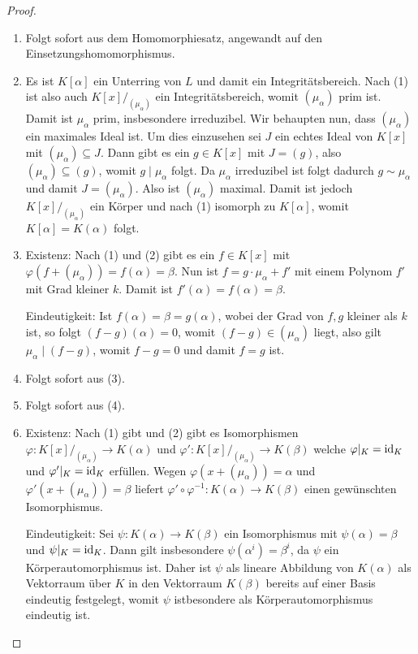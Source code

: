 \begin{proof}{\ }
    \begin{enumerate}
        \item Folgt sofort aus dem Homomorphiesatz, angewandt auf den Einsetzungshomomorphismus.
        
        \item Es ist $K[\alpha]$ ein Unterring von $L$ und damit ein Integritätsbereich. Nach (1) ist also auch $K[x]/_{(\mu_\alpha)}$ ein Integritätsbereich, womit $(\mu_\alpha)$ prim ist. Damit ist $\mu_\alpha$ prim, insbesondere irreduzibel. Wir behaupten nun, dass $(\mu_\alpha)$ ein maximales Ideal ist. Um dies einzusehen sei $J$ ein echtes Ideal von $K[x]$ mit $(\mu_\alpha) \subseteq J$. Dann gibt es ein $g \in K[x]$ mit $J = (g)$, also $(\mu_\alpha) \subseteq (g)$, womit $g \mid \mu_\alpha$ folgt. Da $\mu_\alpha$ irreduzibel ist folgt dadurch $g \sim \mu_\alpha$ und damit $J = (\mu_\alpha)$. Also ist $(\mu_\alpha)$ maximal. Damit ist jedoch $K[x]/_{(\mu_\alpha)}$ ein Körper und nach (1) isomorph zu $K[\alpha]$, womit $K[\alpha] = K(\alpha)$ folgt.
        
        \item Existenz: Nach (1) und (2) gibt es ein $f \in K[x]$ mit $\varphi(f + (\mu_\alpha)) = f(\alpha) = \beta$. Nun ist $f = g \cdot \mu_\alpha + f'$ mit einem Polynom $f'$ mit Grad kleiner $k$. Damit ist $f'(\alpha) = f(\alpha) = \beta$.
        
        Eindeutigkeit: Ist $f(\alpha) = \beta = g(\alpha)$, wobei der Grad von $f, g$ kleiner als $k$ ist, so folgt $(f-g)(\alpha) = 0$, womit $(f-g) \in (\mu_\alpha)$ liegt, also gilt $\mu_\alpha \mid (f-g)$, womit $f-g=0$ und damit $f=g$ ist.

        \item Folgt sofort aus (3).
        
        \item Folgt sofort aus (4).
        
        \item {Existenz:} Nach (1) gibt und (2) gibt es Isomorphismen
        $\varphi:K[x]/_{(\mu_\alpha)}\to K(\alpha)$ und $\varphi':K[x]/_{(\mu_\alpha)}\to K(\beta)$
        welche $\varphi\vert_K=\operatorname{id}_K$ und $\varphi'\vert_K=\operatorname{id}_K$ erfüllen. Wegen $\varphi(x+(\mu_\alpha))=\alpha$
        und $\varphi'(x+(\mu_\alpha))=\beta$ liefert $\varphi'\circ\varphi^{-1}:K(\alpha)\to K(\beta)$
        einen gewünschten Isomorphismus.

        {Eindeutigkeit:} Sei $\psi:K(\alpha)\to K(\beta)$ ein Isomorphismus mit $\psi(\alpha)=\beta$
        und $\psi\vert_K=\operatorname{id}_K$. Dann gilt insbesondere $\psi(\alpha^i)=\beta^i$, da $\psi$ ein Körperautomorphismus
        ist. Daher ist $\psi$ als lineare Abbildung von $K(\alpha)$ als Vektorraum über $K$ in den Vektorraum $K(\beta)$
        bereits auf einer Basis eindeutig festgelegt, womit $\psi$ istbesondere als Körperautomorphismus eindeutig ist.
    \end{enumerate}
\end{proof}

